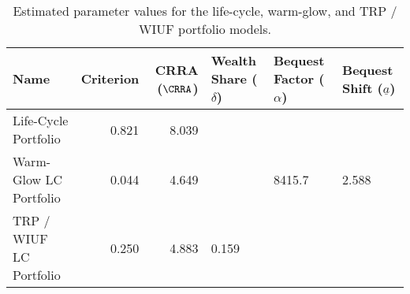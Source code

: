 \begin{table}\centering
    \begin{tabular}{lrrlll}
        \toprule
        Name                   & Criterion & CRRA ($\CRRA$) & Wealth Share ($\delta$) & Bequest Factor ($\alpha$) & Bequest Shift ($\underline{a}$) \\
        \midrule
        Life-Cycle Portfolio   & 0.821     & 8.039          &                         &                           &                                 \\
        Warm-Glow LC Portfolio & 0.044     & 4.649          &                         & 8415.7                    & 2.588                          \\
        TRP / WIUF LC Portfolio       & 0.250     & 4.883          & 0.159                   &                           &                                 \\
        \bottomrule
    \end{tabular}
    \caption{Estimated parameter values for the life-cycle, warm-glow, and TRP / WIUF portfolio models.}
    \label{parameters}
\end{table}